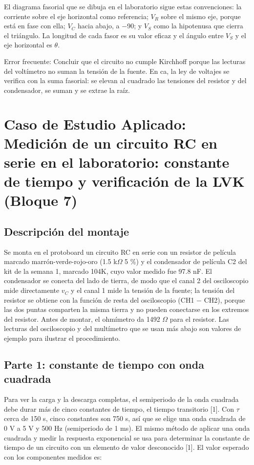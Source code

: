 \documentclass[11pt,letterpaper]{article}
\begin{document}
El diagrama fasorial que se dibuja en el laboratorio sigue estas convenciones: la corriente sobre el eje horizontal como referencia; $V_R$ sobre el mismo eje, porque está en fase con ella; $V_C$ hacia abajo, a \ensuremath{-}90\textdegree{}; y $V_S$ como la hipotenusa que cierra el triángulo. La longitud de cada fasor es su valor eficaz y el ángulo entre $V_S$ y el eje horizontal es $\theta$.

\begin{nota}{Error frecuente:}
Concluir que el circuito \guillemotleft{}no cumple Kirchhoff\guillemotright{} porque las lecturas del voltímetro no suman la tensión de la fuente. En ca, la ley de voltajes se verifica con la suma fasorial: se elevan al cuadrado las tensiones del resistor y del condensador, se suman y se extrae la raíz.
\end{nota}

\section{Caso de Estudio Aplicado: Medición de un circuito RC en serie en el laboratorio: constante de tiempo y verificación de la LVK (Bloque 7)}

\subsection{Descripción del montaje}

Se monta en el protoboard un circuito RC en serie con un resistor de película marcado marrón-verde-rojo-oro (1.5 k\ensuremath{\Omega} \textpm{}5 \%) y el condensador de película C2 del kit de la semana 1, marcado 104K, cuyo valor medido fue 97.8 nF. El condensador se conecta del lado de tierra, de modo que el canal 2 del osciloscopio mide directamente $v_C$ y el canal 1 mide la tensión de la fuente; la tensión del resistor se obtiene con la función de resta del osciloscopio (CH1 \ensuremath{-} CH2), porque las dos puntas comparten la misma tierra y no pueden conectarse en los extremos del resistor. Antes de montar, el ohmímetro da 1492 \ensuremath{\Omega} para el resistor. Las lecturas del osciloscopio y del multímetro que se usan más abajo son valores de ejemplo para ilustrar el procedimiento.

\subsection{Parte 1: constante de tiempo con onda cuadrada}

Para ver la carga y la descarga completas, el semiperiodo de la onda cuadrada debe durar más de cinco constantes de tiempo, el tiempo transitorio [1]. Con $\tau$ cerca de 150 \textmu{}s, cinco constantes son 750 \textmu{}s, así que se elige una onda cuadrada de 0 V a 5 V y 500 Hz (semiperiodo de 1 ms). El mismo método de aplicar una onda cuadrada y medir la respuesta exponencial se usa para determinar la constante de tiempo de un circuito con un elemento de valor desconocido [1]. El valor esperado con los componentes medidos es:
\end{document}
